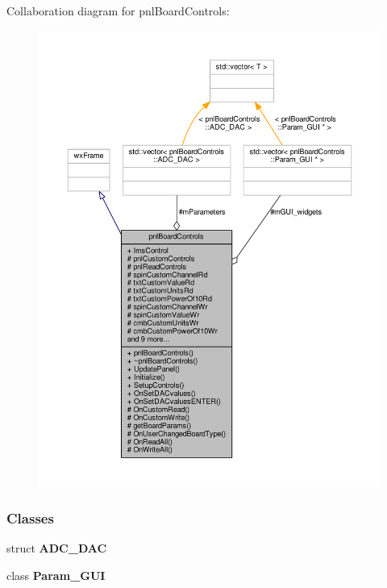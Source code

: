 Collaboration diagram for pnl\+Board\+Controls\+:
\nopagebreak
\begin{figure}[H]
\begin{center}
\leavevmode
\includegraphics[width=350pt]{d8/de7/classpnlBoardControls__coll__graph}
\end{center}
\end{figure}
\subsubsection*{Classes}
\begin{DoxyCompactItemize}
\item 
struct {\bf A\+D\+C\+\_\+\+D\+AC}
\item 
class {\bf Param\+\_\+\+G\+UI}
\end{DoxyCompactItemize}
